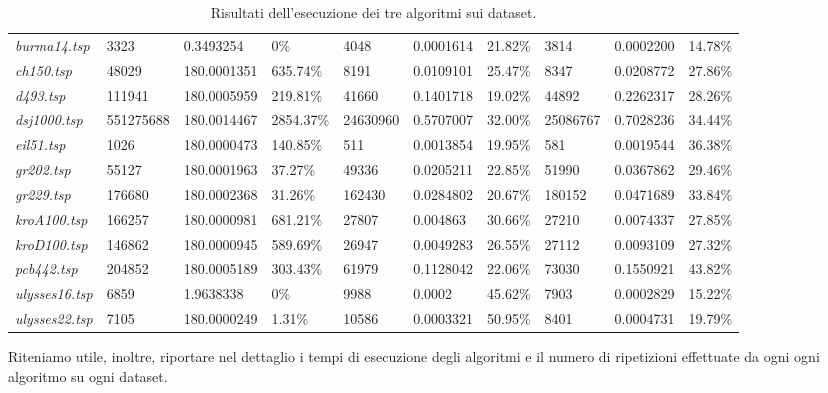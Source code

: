 \begin{landscape}
\begin{table}[]
\begin{tabular}{|l|l|l|l|l|l|l|l|l|l|}
  \textit{burma14.tsp} & 3323 & 0.3493254 & 0\% & 4048 & 0.0001614 & 21.82\% & 3814 & 0.0002200 & 14.78\% \\ 
  \textit{ch150.tsp} & 48029 & 180.0001351 & 635.74\% & 8191 & 0.0109101 & 25.47\% & 8347 & 0.0208772 & 27.86\% \\ 
  \textit{d493.tsp} & 111941 & 180.0005959 & 219.81\% & 41660 & 0.1401718 & 19.02\% & 44892 & 0.2262317 & 28.26\% \\ 
  \textit{dsj1000.tsp} & 551275688 & 180.0014467 & 2854.37\% & 24630960 & 0.5707007 & 32.00\% & 25086767 & 0.7028236 & 34.44\% \\ 
  \textit{eil51.tsp} & 1026 & 180.0000473 & 140.85\% & 511 & 0.0013854 & 19.95\% & 581 & 0.0019544 & 36.38\% \\ 
  \textit{gr202.tsp} & 55127 & 180.0001963 & 37.27\% & 49336 & 0.0205211 & 22.85\% & 51990 & 0.0367862 & 29.46\% \\ 
  \textit{gr229.tsp} & 176680 & 180.0002368 & 31.26\% & 162430 & 0.0284802 & 20.67\% & 180152 & 0.0471689 & 33.84\% \\ 
  \textit{kroA100.tsp} & 166257 & 180.0000981 & 681.21\% & 27807 & 0.004863 & 30.66\% & 27210 & 0.0074337 & 27.85\% \\ 
  \textit{kroD100.tsp} & 146862 & 180.0000945 & 589.69\% & 26947 & 0.0049283 & 26.55\% & 27112 & 0.0093109 & 27.32\% \\ 
  \textit{pcb442.tsp} & 204852 & 180.0005189 & 303.43\% & 61979 & 0.1128042 & 22.06\% & 73030 & 0.1550921 & 43.82\% \\ 
  \textit{ulysses16.tsp} & 6859 & 1.9638338 & 0\% & 9988 & 0.0002 & 45.62\% & 7903 & 0.0002829 & 15.22\% \\ 
  \textit{ulysses22.tsp} & 7105 & 180.0000249 & 1.31\% & 10586 & 0.0003321 & 50.95\% & 8401 & 0.0004731 & 19.79\% \\ \hline
  \end{tabular}
  \caption{Risultati dell'esecuzione dei tre algoritmi sui dataset.}
  \label{tab:results}
  \end{table}
\end{landscape}


Riteniamo utile, inoltre, riportare nel dettaglio i tempi di esecuzione degli algoritmi e il numero di ripetizioni effettuate da ogni ogni algoritmo su ogni dataset.

